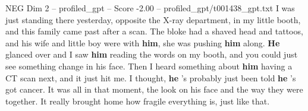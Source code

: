 \begin{textsample}{NEG Dim 2 – profiled\_gpt – Score -2.00 – profiled\_gpt/t001438\_gpt.txt}  \label{ex:f2_neg_040}
I was just standing there yesterday, opposite the X-ray department, in my little booth, and this family came past after a scan.
The bloke had a shaved head and tattoos, and his wife and little boy were with \textbf{him}, she was pushing \textbf{him} along. \textbf{He} glanced over and I saw \textbf{him} reading the words on my booth, and you could just see something change in his face.
Then I heard something about \textbf{him} having a CT scan next, and it just hit me.
I thought, \textbf{he} ’s probably just been told \textbf{he} ’s got cancer.
It was all in that moment, the look on his face and the way they were together.
It really brought home how fragile everything is, just like that.

\end{textsample}
